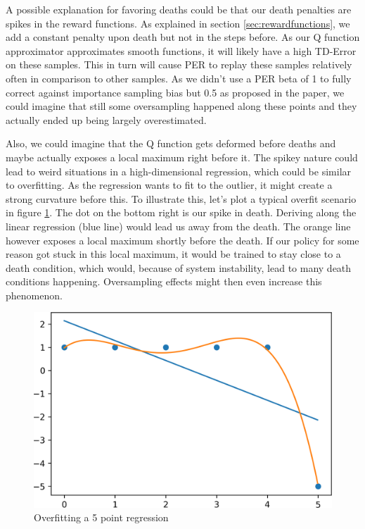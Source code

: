 \documentclass[hyperref,final,beleg]{cgvpub}
\begin{document}
A possible explanation for favoring deaths could be that our death penalties are spikes in the reward functions. As explained in section \ref{sec:rewardfunctions}, we add a constant penalty upon death but not in the steps before. As our Q function approximator approximates smooth functions, it will likely have a high TD-Error on these samples. This in turn will cause \ac{PER} to replay these samples relatively often in comparison to other samples. As we didn't use a \ac{PER} beta of 1 to fully correct against importance sampling bias but 0.5 as proposed in the paper, we could imagine that still some oversampling happened along these points and they actually ended up being largely overestimated.

Also, we could imagine that the Q function gets deformed before deaths and maybe actually exposes a local maximum right before it. The spikey nature could lead to weird situations in a high-dimensional regression, which could be similar to overfitting. As the regression wants to fit to the outlier, it might create a strong curvature before this. To illustrate this, let's plot a typical overfit scenario in figure \ref{fig:overfit}. The dot on the bottom right is our spike in death. Deriving along the linear regression (blue line) would lead us away from the death. The orange line however exposes a local maximum shortly before the death. If our policy for some reason got stuck in this local maximum, it would be trained to stay close to a death condition, which would, because of system instability, lead to many death conditions happening. Oversampling effects might then even increase this phenomenon.

\begin{figure}
  \centering
  \includegraphics[width=0.5\linewidth]{images/overfit.png}
  \caption{Overfitting a 5 point regression}
  \label{fig:overfit}
\end{figure}
\end{document}
